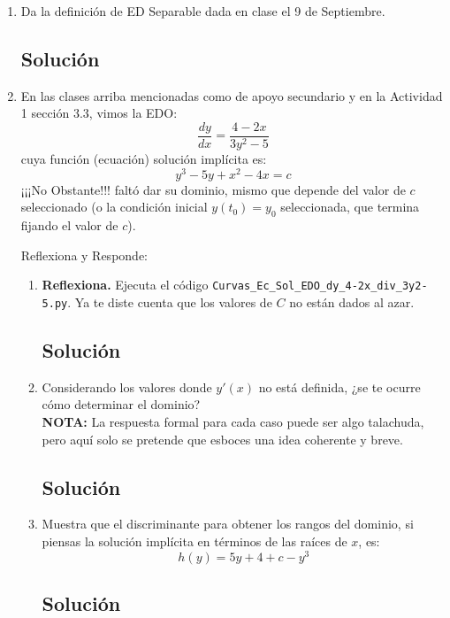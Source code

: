 \begin{enumerate}[label=\arabic*., leftmargin=*]
    \item Da la definición de ED Separable dada en clase el 9 de Septiembre.
    \subsection*{Solución}

    \item En las clases arriba mencionadas como de apoyo secundario y en la Actividad 1 sección 3.3, vimos la EDO:
    \[ \frac{dy}{dx} = \frac{4-2x}{3y^{2}-5} \]
    cuya función (ecuación) solución implícita es:
    \[ y^{3}-5y+x^{2}-4x=c \]
    ¡¡¡No Obstante!!! faltó dar su dominio, mismo que depende del valor de $c$ seleccionado (o la condición inicial $y(t_{0})=y_{0}$ seleccionada, que termina fijando el valor de $c$).

    Reflexiona y Responde:
    \begin{enumerate}[label=(\alph*), leftmargin=*]
        \item \textbf{Reflexiona.} Ejecuta el código \texttt{Curvas\_Ec\_Sol\_EDO\_dy\_4-2x\_div\_3y2-5.py}. Ya te diste cuenta que los valores de $C$ no están dados al azar.
        \subsection*{Solución}

        \item Considerando los valores donde $y'(x)$ no está definida, ¿se te ocurre cómo determinar el dominio? \\
        \textbf{NOTA:} La respuesta formal para cada caso puede ser algo talachuda, pero aquí solo se pretende que esboces una idea coherente y breve.
        \subsection*{Solución}

        \item Muestra que el discriminante para obtener los rangos del dominio, si piensas la solución implícita en términos de las raíces de $x$, es:
        \[ h(y) = 5y + 4 + c - y^{3} \]
        \subsection*{Solución}
    \end{enumerate}


\end{enumerate}
